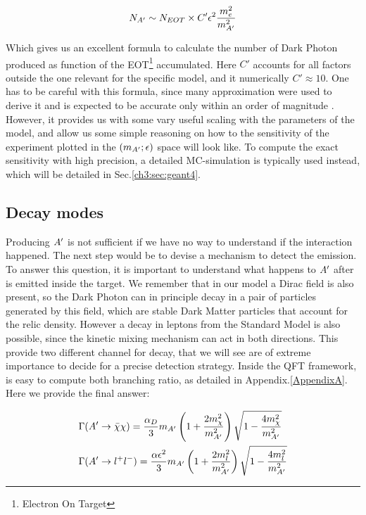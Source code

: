 \begin{equation}
  \label{eq:dm-rate}
  N_{A'} \sim N_{EOT} \times C' \epsilon^2 \frac{m_e^2}{m^2_{A'}}
\end{equation}

Which gives us an excellent formula to calculate the number of Dark Photon produced as function of the EOT\footnote{Electron On Target} accumulated. Here $C'$ accounts for all factors outside the one relevant for the specific model, and it numerically $C' \approx 10$. One has to be careful with this formula, since many approximation were used to derive it and is expected to be accurate only within an order of magnitude \cite{jdb}. However, it provides us with some vary useful scaling with the parameters of the model, and allow us some simple reasoning on how to the sensitivity of the experiment plotted in the $(m_{A'};\epsilon)$ space will look like. To compute the exact sensitivity with high precision, a detailed MC-simulation is typically used instead, which will be detailed in Sec.\ref{ch3:sec:geant4}.

\subsection{Decay modes}
\label{ch1:sec:dm-decay}

Producing $A'$ is not sufficient if we have no way to understand if the interaction happened. The next step would be to devise a mechanism to detect the emission. To answer this question, it is important to understand what happens to $A'$ after is emitted inside the target. We remember that in our model a Dirac field is also present, so the Dark Photon can in principle decay in a pair of particles generated by this field, which are stable Dark Matter particles that account for the relic density. However a decay in leptons from the Standard Model is also possible, since the kinetic mixing mechanism can act in both directions. This provide two different channel for decay, that we will see are of extreme importance to decide for a precise detection strategy. Inside the QFT framework, is easy to compute both branching ratio, as detailed in Appendix.\ref{AppendixA}. Here we provide the final answer:

\begin{equation}
  \label{eq:dm-bratio}
  \begin{aligned}
    &\Gamma(A' \to \bar{\chi} \chi) = \frac{\alpha_D}{3} m_{A'} \left( 1 + \frac{2m^2_{\chi}}{m_{A'}^2}\right) \sqrt{1 - \frac{4m_{\chi}^2}{m^2_{A'}}}\\
    &\Gamma(A' \to l^+l^-) = \frac{\alpha \epsilon^2}{3} m_{A'} \left( 1 + \frac{2m^2_{l}}{m_{A'}^2}\right) \sqrt{1 - \frac{4m_{l}^2}{m^2_{A'}}}
  \end{aligned}
\end{equation}

